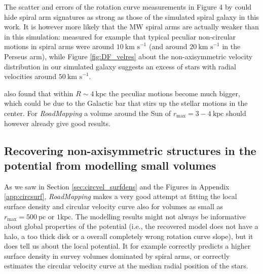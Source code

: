 \documentclass[iop,revtex4,numberedappendix,appendixfloats]{emulateapj}
\newcommand{\RM}{{\sl RoadMapping}}
\begin{document}
The scatter and errors of the rotation curve measurements in Figure 4 by \citet{2014ApJ...783..130R} could hide spiral arm signatures as strong as those of the simulated spiral galaxy in this work. It is however more likely that the MW spiral arms are actually weaker than in this simulation: \citet{2014ApJ...783..130R} measured for example that typical peculiar non-circular motions in spiral arms were around $10~\text{km s}^{−1}$ (and around $20~\text{km s}^{−1}$ in the Perseus arm), while Figure \ref{fig:DF_velres} about the non-axisymmetric velocity distribution in our simulated galaxy suggests an excess of stars with radial velocities around $50~\text{km s}^{-1}$.

\citet{2014ApJ...783..130R} also found that within $R\sim 4~\text{kpc}$ the peculiar motions become much bigger, which could be due to the Galactic bar that stirs up the stellar motions in the center. For \RM{} a volume around the Sun of $r_\text{max}=3-4~\text{kpc}$ should however already give good results. 

\subsection{Recovering non-axisymmetric structures in the potential from modelling small volumes}

As we saw in Section \ref{sec:circvel_surfdens} and the Figures in Appendix \ref{app:circsurf}, \RM{} makes a very good attempt at fitting the local surface density and circular velocity curve also for volumes as small as $r_\text{max}=500~\text{pc}$ or $1\text{kpc}$. The modelling results might not always be informative about global properties of the potential (i.e., the recovered model does not have a halo, a too thick disk or a overall completely wrong rotation curve slope), but it does tell us about the local potential. It for example correctly predicts a higher surface density in survey volumes dominated by spiral arms, or correctly estimates the circular velocity curve at the median radial position of the stars. 
\end{document}
